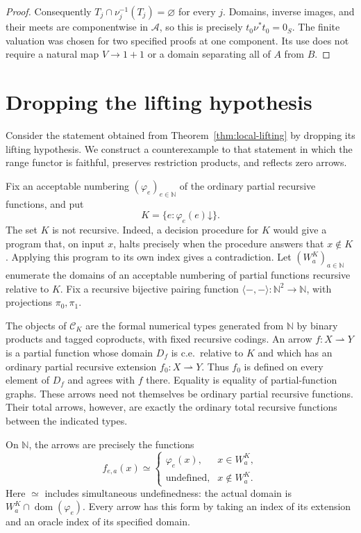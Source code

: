 \documentclass[11pt]{article}
\newcommand{\N}{\mathbb N}
\begin{document}
\begin{proof}
Consequently $T_j\cap\nu_j^{-1}(T_j)=\varnothing$ for every
$j$. Domains, inverse images, and their meets are componentwise
in $\mathcal A$, so this is precisely $t_0\nu^*t_0=0_S$.
The finite valuation was chosen for two specified proofs at one
component. Its use does not require a natural map $V\to1+1$
or a domain separating all of $A$ from $B$.
\end{proof}

\section{Dropping the lifting hypothesis}
\label{app:lifting-counterexample}

Consider the statement obtained from Theorem~\ref{thm:local-lifting}
by dropping its lifting hypothesis. We construct a counterexample to
that statement in which the range functor is faithful, preserves
restriction products, and reflects zero arrows.

Fix an acceptable numbering $(\varphi_e)_{e\in\N}$ of the ordinary
partial recursive functions, and put
\[
 K=\{e:\varphi_e(e)\mathord\downarrow\}.
\]
The set $K$ is not recursive. Indeed, a decision procedure for $K$
would give a program that, on input $x$, halts precisely when the
procedure answers that $x\notin K$. Applying this program to its own
index gives a contradiction.
Let $(W_a^K)_{a\in\N}$ enumerate the domains of an acceptable
numbering of partial functions recursive relative to $K$.
Fix a recursive bijective pairing function
$\langle-,-\rangle:\N^2\to\N$, with projections $\pi_0,\pi_1$.

The objects of $\mathcal C_K$ are the formal numerical types generated
from $\N$ by binary products and tagged coproducts, with fixed recursive
codings. An arrow $f:X\rightharpoonup Y$ is a partial function whose
domain $D_f$ is c.e.\ relative to $K$ and which has an ordinary partial
recursive extension $f_0:X\rightharpoonup Y$. Thus $f_0$ is defined
on every element of $D_f$ and agrees with $f$ there. Equality is equality
of partial-function graphs. These arrows need not themselves be ordinary
partial recursive functions. Their total arrows, however, are exactly
the ordinary total recursive functions between the indicated types.

On $\N$, the arrows are precisely the functions
\[
 f_{e,a}(x)\simeq
 \begin{cases}
  \varphi_e(x),&x\in W_a^K,\\
  \text{undefined},&x\notin W_a^K.
 \end{cases}
\]
Here $\simeq$ includes simultaneous undefinedness: the actual domain
is $W_a^K\cap\operatorname{dom}(\varphi_e)$. Every arrow has this
form by taking an index of its extension and an oracle index of its
specified domain.
\end{document}
